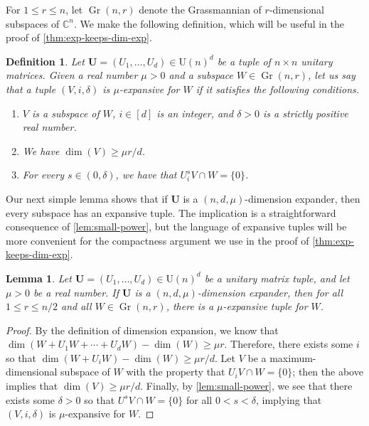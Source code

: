 \documentclass[11pt]{article}
\newtheorem{lemma}[theorem]{Lemma}
\newtheorem{definition}[theorem]{Definition}
\theoremstyle{plain}
\numberwithin{equation}{section}
\theoremstyle{definition}
\DeclareMathOperator\Gr{Gr}
\newcommand{\bC}{\mathbb{C}}
\newcommand{\tuple}[1]{\mathbf{#1}}
\newcommand{\vU}{\tuple{U}}
\begin{document}
For $1 \leq r \leq n$, let $\Gr(n,r)$ denote the Grassmannian of $r$-dimensional subspaces of $\bC^n$. We make the following definition, which will be useful in the proof of \cref{thm:exp-keeps-dim-exp}. 
%
\begin{definition}
    Let $\vU=(U_1,\dots,U_d)\in\mathrm{U}(n)^d$ be a tuple of $n \times n$ unitary matrices. 
    Given a real number $\mu>0$ and a subspace $W \in \Gr(n,r)$, let us say that a tuple $(V,i,\delta)$ is $\mu$-\emph{expansive for $W$} if it satisfies the following conditions.
    \begin{enumerate}[label=(\roman*)]
        \item $V$ is a subspace of $W$, $i \in [d]$ is an integer, and $\delta>0$ is a strictly positive real number.
        \item We have $\dim (V) \geq \mu r/d$.
        \item For every $s \in (0,\delta)$, we have that $U_i^s V \cap W=\{0\}$. 
    \end{enumerate}
\end{definition}
Our next simple lemma shows that if $\vU$ is a $(n,d,\mu)$-dimension expander, then every subspace has an expansive tuple. The implication is a straightforward consequence of \cref{lem:small-power}, but the language of expansive tuples will be more convenient for the compactness argument we use in the proof of \cref{thm:exp-keeps-dim-exp}.
\begin{lemma}\label{lem:expansive-exists}
    Let $\vU=(U_1,\dots,U_d)\in\mathrm{U}(n)^d$ be a unitary matrix tuple, and let $\mu>0$ be a real number. If $\vU$ is a $(n,d,\mu)$-dimension expander, then for all $1 \leq r \leq n/2$ and all $W \in \Gr(n,r)$, there is a $\mu$-expansive tuple for $W$.
\end{lemma}
\begin{proof}
    By the definition of dimension expansion, we know that $\dim(W+U_1 W + \dotsb + U_d W) - \dim(W) \geq \mu r$. Therefore, there exists some $i$ so that $\dim(W+U_i W)-\dim(W) \geq \mu r/d$. Let $V$ be a maximum-dimensional subspace of $W$ with the property that $U_i V \cap W = \{0\}$; then the above implies that $\dim(V) \geq \mu r/d$. Finally, by \cref{lem:small-power}, we see that there exists some $\delta>0$ so that $U^s V \cap W = \{0\}$ for all $0<s<\delta$, implying that $(V,i,\delta)$ is $\mu$-expansive for $W$.
\end{proof}
\end{document}
